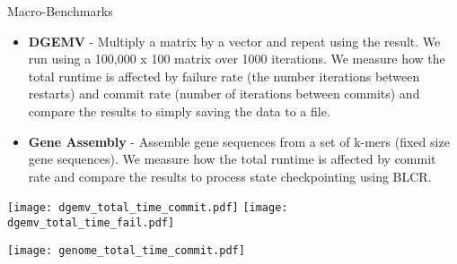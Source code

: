 \begin{block}{Macro-Benchmarks}
    \begin{itemize}
        \item \textbf{DGEMV} - Multiply a matrix by a vector and repeat using
            the result. We run using a 100,000 x 100 matrix over 1000
            iterations.  We measure how the total runtime is affected by
            failure rate (the number iterations between restarts) and commit
            rate (number of iterations between commits) and compare the
            results to simply saving the data to a file.
        \item \textbf{Gene Assembly} - Assemble gene sequences from a set of
            k-mers (fixed size gene sequences). We measure how the total
            runtime is affected by commit rate and compare the results to
            process state checkpointing using BLCR.
    \end{itemize}

    \centering

    \texttt{[image: dgemv\_total\_time\_commit.pdf]}
    \texttt{[image: dgemv\_total\_time\_fail.pdf]}

    \texttt{[image: genome\_total\_time\_commit.pdf]}
\end{block}
